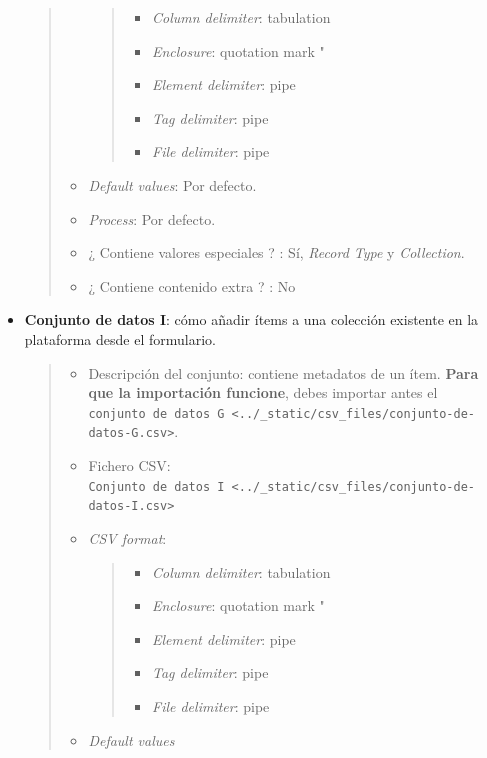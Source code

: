 \documentclass[
]{article}
\providecommand{\tightlist}{%
  \setlength{\itemsep}{0pt}\setlength{\parskip}{0pt}}
\begin{document}
\begin{itemize}
\begin{quote}
\begin{itemize}
    \begin{quote}
    \begin{itemize}
    \tightlist
    \item
      \emph{Column delimiter}: tabulation
    \item
      \emph{Enclosure}: quotation mark "
    \item
      \emph{Element delimiter}: pipe
    \item
      \emph{Tag delimiter}: pipe
    \item
      \emph{File delimiter}: pipe
    \end{itemize}
    \end{quote}
  \item
    \emph{Default values}: Por defecto.
  \item
    \emph{Process}: Por defecto.
  \item
    ¿ Contiene valores especiales ? : Sí, \emph{Record Type} y
    \emph{Collection}.
  \item
    ¿ Contiene contenido extra ? : No
  \end{itemize}
  \end{quote}
\item
  \textbf{Conjunto de datos I}: cómo añadir ítems a una colección
  existente en la plataforma desde el formulario.

  \begin{quote}
  \begin{itemize}
  \item
    Descripción del conjunto: contiene metadatos de un ítem.
    \textbf{Para que la importación funcione}, debes importar antes el
    \texttt{conjunto\ de\ datos\ G\ \textless{}../\_static/csv\_files/conjunto-de-datos-G.csv\textgreater{}}.
  \item
    Fichero CSV:
    \texttt{Conjunto\ de\ datos\ I\ \textless{}../\_static/csv\_files/conjunto-de-datos-I.csv\textgreater{}}
  \item
    \emph{CSV format}:

    \begin{quote}
    \begin{itemize}
    \tightlist
    \item
      \emph{Column delimiter}: tabulation
    \item
      \emph{Enclosure}: quotation mark "
    \item
      \emph{Element delimiter}: pipe
    \item
      \emph{Tag delimiter}: pipe
    \item
      \emph{File delimiter}: pipe
    \end{itemize}
    \end{quote}
  \item
    \emph{Default values}


\end{itemize}
\end{quote}
\end{itemize}
\end{document}
